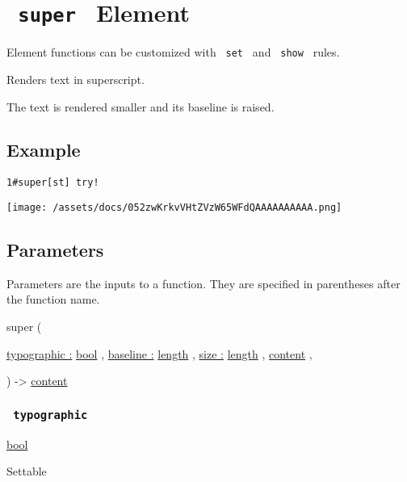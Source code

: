 \section{\texorpdfstring{\texttt{\ super\ } {{ Element
}}}{ super   Element }}\label{summary}

\label{element-tooltip}
Element functions can be customized with \texttt{\ set\ } and
\texttt{\ show\ } rules.

Renders text in superscript.

The text is rendered smaller and its baseline is raised.

\subsection{Example}\label{example}

\begin{verbatim}
1#super[st] try!
\end{verbatim}

\texttt{[image: /assets/docs/052zwKrkvVHtZVzW65WFdQAAAAAAAAAA.png]}

\subsection{\texorpdfstring{{ Parameters
}}{ Parameters }}\label{parameters}

\label{parameters-tooltip}
Parameters are the inputs to a function. They are specified in
parentheses after the function name.

{ super } (

{ \hyperref[parameters-typographic]{typographic :}
\href{/docs/reference/foundations/bool/}{bool} , } {
\hyperref[parameters-baseline]{baseline :}
\href{/docs/reference/layout/length/}{length} , } {
\hyperref[parameters-size]{size :}
\href{/docs/reference/layout/length/}{length} , } {
\href{/docs/reference/foundations/content/}{content} , }

) -\textgreater{} \href{/docs/reference/foundations/content/}{content}

\subsubsection{\texorpdfstring{\texttt{\ typographic\ }}{ typographic }}\label{parameters-typographic}

\href{/docs/reference/foundations/bool/}{bool}

{{ Settable }}

